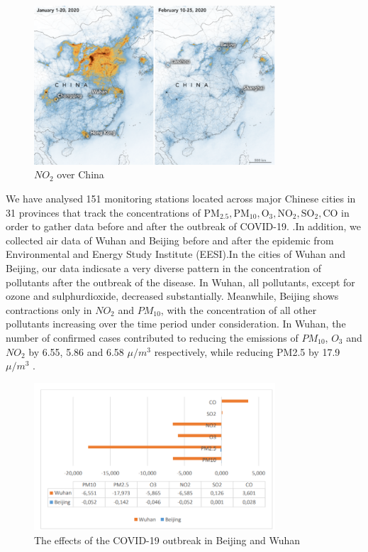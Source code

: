 \documentclass{apmcmthesis}
\begin{document}
\begin{figure}
    \centering
    \includegraphics[width=9cm]{APMCMThesis/figures/china_no2.png}
    \caption{ $NO_2$ over China\cite{bib:two}}
\label{no_2}
\end{figure}     

 We have analysed 151 monitoring stations located across major Chinese cities in 31 provinces that track the concentrations of $\mathrm{PM}_{2.5}, \mathrm{PM}_{10}, \mathrm{O}_3, \mathrm{NO}_2, \mathrm{SO}_2, \mathrm{CO}$ in order to gather data before and after the outbreak of COVID-19. \cite{wuhan}.In addition, we collected air data of Wuhan and Beijing before and after the epidemic from Environmental and Energy Study Institute (EESI).In the cities of Wuhan and Beijing, our data indicsate a very diverse pattern in the concentration of pollutants after the outbreak of the disease. In Wuhan, all pollutants, except for ozone and sulphurdioxide, decreased substantially. Meanwhile, Beijing shows contractions only in $NO_2$ and $PM_10$, with the concentration of all other pollutants increasing over the time period under consideration. In Wuhan, the number of confirmed cases contributed to reducing the emissions of $PM_10$, $O_3$ and $NO_2$ by 6.55, 5.86 and 6.58 $μ/m^3$ respectively, while reducing PM2.5 by 17.9$ μ/m^3$ .


\begin{figure}
    \centering
    \includegraphics[width=9cm]{APMCMThesis/figures/wuhan.png}
    \caption{ The effects of the COVID-19 outbreak in Beijing and Wuhan\cite{bib:two}}
\label{wuhan}
\end{figure}    
\end{document}
